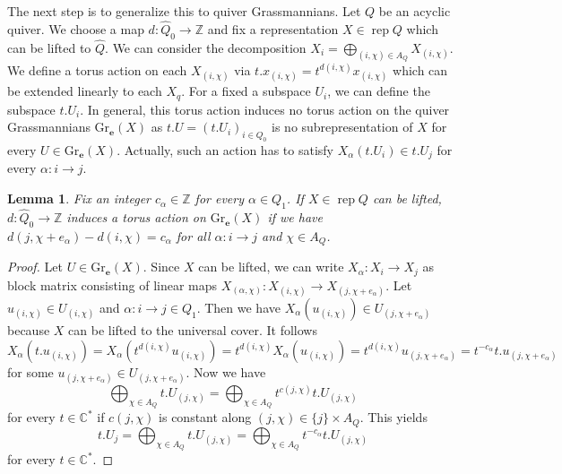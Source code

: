 \documentclass{amsart}
\newtheorem{lemma}[theorem]{Lemma}
\numberwithin{equation}{section}
\newcommand{\bfe}{\mathbf{e}}
\newcommand{\C}{\mathbb{C}}
\newcommand{\rep}{\operatorname{rep}}
\newcommand{\Gr}{\mathrm{Gr}}
\newcommand{\ZZ}{\mathbb{Z}}
\begin{document}
The next step is to generalize this to quiver Grassmannians.
Let $Q$ be an acyclic quiver.
We choose a map $d:\hat Q_0\to\ZZ$ and fix a representation $X\in\rep Q$ which can be lifted to $\hat Q$.
We can consider the decomposition $X_i=\bigoplus_{(i,\chi)\in A_Q} X_{(i,\chi)}$.
We define a torus action on each $X_{(i,\chi)}$ via $t.x_{(i,\chi)}=t^{d(i,\chi)}x_{(i,\chi)}$ which can be extended linearly to each $X_q$.
For a fixed a subspace $U_i$, we can define the subspace $t.U_i$.
In general, this torus action induces no torus action on the quiver Grassmannians $\Gr_\bfe(X)$ as $t.U=(t.U_i)_{i\in Q_0}$ is no subrepresentation of $X$ for every $U\in\Gr_\bfe(X)$.
Actually, such an action has to satisfy $X_\alpha(t.U_i)\in t.U_j$ for every $\alpha:i\to j$. 
\begin{lemma}
  Fix an integer $c_\alpha\in\ZZ$ for every $\alpha\in Q_1$.
  If $X\in\rep Q$ can be lifted, $d:\hat Q_0\to\ZZ$ induces a torus action on $\Gr_\bfe(X)$ if we have $d(j,\chi+e_\alpha)-d(i,\chi)=c_\alpha$ for all $\alpha:i\to j$ and $\chi\in A_Q$.
\end{lemma}
\begin{proof} 
  Let $U\in\Gr_\bfe(X)$. Since $X$ can be lifted, we can write $X_\alpha:X_i\to X_j$ as block matrix consisting of linear maps $X_{(\alpha,\chi)}:X_{(i,\chi)}\to X_{(j,\chi+e_\alpha)}$. Let $u_{(i,\chi)}\in U_{(i,\chi)}$ and $\alpha:i\to j\in Q_1$. Then we have $X_\alpha(u_{(i,\chi)})\in U_{(j,\chi+e_\alpha)}$ because $X$ can be lifted to the universal cover. It follows
\[X_\alpha(t.u_{(i,\chi)})=X_\alpha(t^{d(i,\chi)}u_{(i,\chi)})=t^{d(i,\chi)}X_\alpha(u_{(i,\chi)})=t^{d(i,\chi)}u_{(j,\chi+e_\alpha)}=t^{-c_\alpha}t.u_{(j,\chi+e_\alpha)}\]
for some $u_{(j,\chi+e_\alpha)}\in U_{(j,\chi+e_\alpha)}$.
Now we have \[\bigoplus_{\chi\in A_Q} t.U_{(j,\chi)}=\bigoplus_{\chi\in A_Q}t^{c(j,\chi)}t.U_{(j,\chi)}\]
for every $t\in\C^\ast$ if $c(j,\chi)$ is constant along $(j,\chi)\in \{j\}\times A_Q$. This yields  
\[t.U_j=\bigoplus_{\chi\in A_Q} t.U_{(j,\chi)}=\bigoplus_{\chi\in A_Q}t^{-c_\alpha}t.U_{(j,\chi)}\]
for every $t\in \C^\ast$.
\end{proof}
\end{document}
